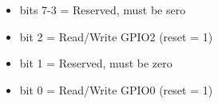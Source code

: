 \begin{itemize}
\item bits 7-3 = Reserved, must be sero
\item bit 2 = Read/Write GPIO2 (reset = 1)
\item bit 1 = Reserved, must be zero
\item bit 0 = Read/Write GPIO0 (reset = 1)
\end{itemize}
